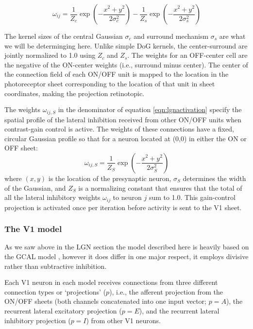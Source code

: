 \begin{equation}
\omega_{ij}=\frac{1}{Z_c}\exp{\left(-\frac{x^{2}+y^{2}}{2\sigma_{c}^{2}}\right)}-\frac{1}{Z_s}\exp\left(-\frac{x^{2}+y^{2}}{2\sigma_{s}^{2}}\right)
\label{eqn:DoG}
\end{equation}

The kernel sizes of the central Gaussian $\sigma_{c}$ and surround
mechanism $\sigma_{s}$ are what we will be determinging here. Unlike
simple DoG kernels, the center-surround are jointly normalized to 1.0
using $Z_c$ and $Z_s$. The weights for an OFF-center cell are the
negative of the ON-center weights (i.e., surround minus center). The
center of the connection field of each ON/OFF unit is mapped to the
location in the photoreceptor sheet corresponding to the location of
that unit in sheet coordinates, making the projection retinotopic.

The weights $\omega_{ij, S}$ in the denominator of equation
\ref{eqn:lgnactivation} specify the spatial profile of the lateral
inhibition received from other ON/OFF units when contrast-gain control
is active. The weights of these connections have a fixed, circular
Gaussian profile so that for a neuron located at (0,0) in either the
ON or OFF sheet:
\begin{equation}
\omega_{ij,S}=\frac{1}{Z_S}\exp\left(-\frac{x^{2}+y^{2}}{2\sigma_{S}^{2}}\right)
\label{eqn:gauss}
\end{equation}
where $(x, y)$ is the location of the presynaptic neuron, $\sigma_{S}$
determines the width of the Gaussian, and $Z_S$ is a normalizing
constant that ensures that the total of all the lateral inhibitory
weights $\omega_{ij}$ to neuron $j$ sum to 1.0. This gain-control
projection is activated once per iteration before activity is sent to
the V1 sheet.

\subsubsection{The V1 model}

As we saw above in the LGN section the model described here is heavily
based on the GCAL model \citep{Stevens2013}, however it does differ in
one major respect, it employs divisive rather than subtractive
inhibition.

Each V1 neuron in each model receives connections from three different
connection types or `projections' ($p$), i.e., the afferent projection
from the ON/OFF sheets (both channels concatenated into one input
vector; $p=A$), the recurrent lateral excitatory projection ($p=E$),
and the recurrent lateral inhibitory projection ($p=I$) from other V1
neurons.

